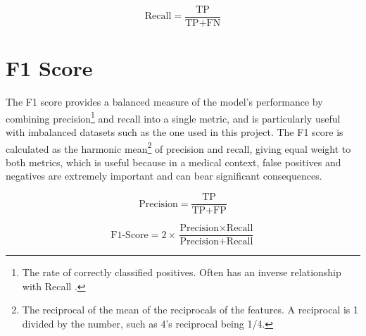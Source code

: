 \begin{equation}\label{eq:Recall}
    \text{Recall} = \frac{\text{TP}}{\text{TP} + \text{FN}}
\end{equation}

\section{F1 Score}
The F1 score provides a balanced measure of the model's performance by combining precision\footnote{The rate of correctly classified positives. Often has an inverse relationship with Recall \autocite{google_classification_nodate}.}
and recall into a single metric, and is particularly useful with imbalanced datasets such as the one used in this project.
The F1 score is calculated as the harmonic mean\footnote{The reciprocal of the mean of the reciprocals of the features. A reciprocal is 1 divided by the number, such as 4's reciprocal being 1/4.}
of precision and recall, giving equal weight to both metrics, which is useful because in a medical context, false positives and negatives are extremely important 
and can bear significant consequences.

\begin{equation}\label{eq:Precision}
    \text{Precision} = \frac{\text{TP}}{\text{TP} + \text{FP}}
\end{equation}

\begin{equation}\label{eq:F1Score}
    \text{F1-Score} = 2 \times \frac{\text{Precision} \times \text{Recall}}{\text{Precision} + \text{Recall}}
\end{equation}

